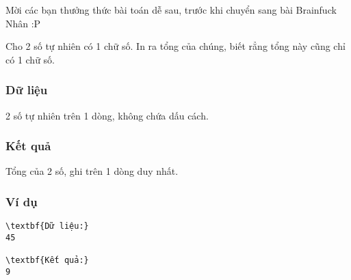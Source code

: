 



   Mời các bạn thưởng thức bài toán dễ sau, trước khi chuyển sang bài Brainfuck Nhân :P  

   Cho 2 số tự nhiên có 1 chữ số. In ra tổng của chúng, biết rẳng tổng này cũng chỉ có 1 chữ số.  

\subsubsection{   Dữ liệu  }

   2 số tự nhiên trên 1 dòng, không chứa dấu cách.  

\subsubsection{   Kết quả  }

   Tổng của 2 số, ghi trên 1 dòng duy nhất.  

\subsubsection{   Ví dụ  }
\begin{verbatim}
\textbf{Dữ liệu:}
45

\textbf{Kết quả:}
9
\end{verbatim}
